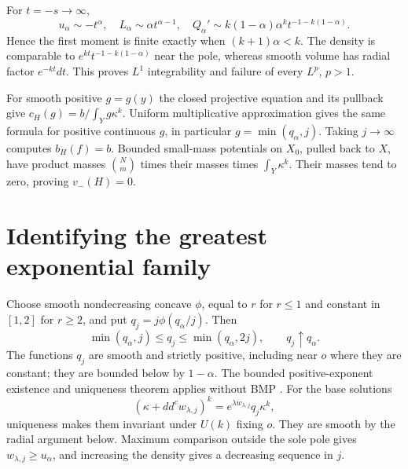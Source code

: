 \documentclass[11pt]{article}
\newcommand{\ddc}{dd^c}
\theoremstyle{remark}\newtheorem{remark}[theorem]{Remark}
\begin{document}
For $t=-s\to\infty$,
\[
 u_\alpha\sim-t^\alpha,\quad
 L_\alpha\sim\alpha t^{\alpha-1},\quad
 Q_\alpha'\sim k(1-\alpha)\alpha^k t^{-1-k(1-\alpha)}.
\]
Hence the first moment is finite exactly when $(k+1)\alpha<k$.
The density is comparable to
$e^{kt}t^{-1-k(1-\alpha)}$ near the pole, whereas smooth volume has
radial factor $e^{-kt}dt$. This proves $L^1$ integrability and failure
of every $L^p$, $p>1$.

For smooth positive $g=g(y)$ the closed projective equation and its
pullback give
$c_H(g)=b/\int_Yg\kappa^k$. Uniform multiplicative approximation gives
the same formula for positive continuous $g$, in particular
$g=\min(q_\alpha,j)$. Taking $j\to\infty$ computes $b_H(f)=b$.
Bounded small-mass potentials on $X_0$, pulled back to $X$, have product
masses $\binom Nm$ times their masses times $\int_Y\kappa^k$.
Their masses tend to zero, proving $v_-(H)=0$.

\section{Identifying the greatest exponential family}
Choose smooth nondecreasing concave $\phi$, equal to $r$ for $r\leq1$
and constant in $[1,2]$ for $r\geq2$, and put $q_j=j\phi(q_\alpha/j)$.
Then
\[
 \min(q_\alpha,j)\leq q_j\leq\min(q_\alpha,2j),\qquad q_j\uparrow q_\alpha.
\]
The functions $q_j$ are smooth and strictly positive, including near $o$
where they are constant; they are bounded below by $1-\alpha$.
The bounded positive-exponent existence and
uniqueness theorem applies without BMP \cite[Theorem 4.5]{BGL}.
For the base solutions
\[
 (\kappa+\ddc w_{\lambda,j})^k
       =e^{\lambda w_{\lambda,j}}q_j\kappa^k,
\]
uniqueness makes them invariant under $U(k)$ fixing $o$.
They are smooth by the radial
argument below. Maximum comparison outside the sole pole gives
$w_{\lambda,j}\geq u_\alpha$, and increasing the density gives a
decreasing sequence in $j$.
\end{document}
